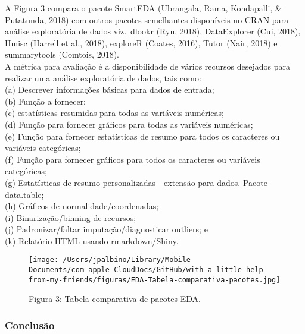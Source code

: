 \documentclass[
]{article}
\begin{document}
A Figura 3 compara o pacote SmartEDA (Ubrangala, Rama, Kondapalli, \&
Putatunda, 2018) com outros pacotes semelhantes disponíveis no CRAN para
análise exploratória de dados viz.~dlookr (Ryu, 2018), DataExplorer
(Cui, 2018), Hmisc (Harrell et al., 2018), exploreR (Coates, 2016),
Tutor (Nair, 2018) e summarytools (Comtois, 2018).\\
A métrica para avaliação é a disponibilidade de vários recursos
desejados para realizar uma análise exploratória de dados, tais como:\\
(a) Descrever informações básicas para dados de entrada;\\
(b) Função a fornecer;\\
(c) estatísticas resumidas para todas as variáveis numéricas;\\
(d) Função para fornecer gráficos para todas as variáveis numéricas;\\
(e) Função para fornecer estatísticas de resumo para todos os caracteres
ou variáveis categóricas;\\
(f) Função para fornecer gráficos para todos os caracteres ou variáveis
categóricas;\\
(g) Estatísticas de resumo personalizadas - extensão para dados. Pacote
data.table;\\
(h) Gráficos de normalidade/coordenadas;\\
(i) Binarização/binning de recursos;\\
(j) Padronizar/faltar imputação/diagnosticar outliers; e\\
(k) Relatório HTML usando rmarkdown/Shiny.

\begin{figure}
\centering
\texttt{[image: /Users/jpalbino/Library/Mobile Documents/com~apple~CloudDocs/GitHub/with-a-little-help-from-my-friends/figuras/EDA-Tabela-comparativa-pacotes.jpg]}
\caption{Figura 3: Tabela comparativa de pacotes EDA.}
\end{figure}

\hypertarget{conclusuxe3o}{%
\subsubsection{Conclusão}\label{conclusuxe3o}}
\end{document}
